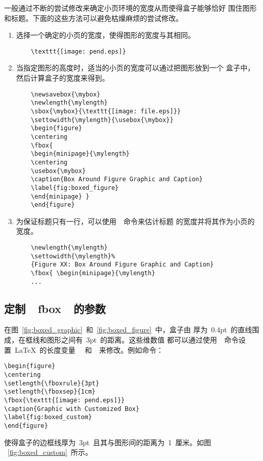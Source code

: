 一般通过不断的尝试修改来确定小页环境的宽度从而使得盒子能够恰好
围住图形和标题。下面的这些方法可以避免枯燥麻烦的尝试修改。
\begin{enumerate}
	\item 选择一个确定的小页的宽度，使得图形的宽度与其相同。
	\begin{Verbatim}
	\texttt{[image: pend.eps]}
	\end{Verbatim}
	\item 当指定图形的高度时，适当的小页的宽度可以通过把图形放到一个
	盒子中，然后计算盒子的宽度来得到。
	\begin{Verbatim}
	\newsavebox{\mybox} 
	\newlength{\mylength} 
	\sbox{\mybox}{\texttt{[image: file.eps]}} 
	\settowidth{\mylength}{\usebox{\mybox}} 
	\begin{figure}
	\centering 
	\fbox{ 
	\begin{minipage}{\mylength} 
	\centering 
	\usebox{\mybox} 
	\caption{Box Around Figure Graphic and Caption} 
	\label{fig:boxed_figure} 
	\end{minipage} } 
	\end{figure}
	\end{Verbatim}
	\item 为保证标题只有一行，可以使用~~命令来估计标题
	的宽度并将其作为小页的宽度。
	\begin{Verbatim}
	\newlength{\mylength} 
	\settowidth{\mylength}%
	{Figure XX: Box Around Figure Graphic and Caption} 
	\fbox{ \begin{minipage}{\mylength} 
	...
	\end{Verbatim}
\end{enumerate}

\subsection{定制~~fbox~~的参数}

在图~\ref{fig:boxed_graphic}~和~\ref{fig:boxed_figure}~中，盒子由
厚为~0.4pt~的直线围成，在框线和图形之间有~3pt~的距离。这些维数值
都可以通过使用~~命令设置~\LaTeX{}~的长度变量
~~和~~来修改。例如命令：
\begin{Verbatim}[xleftmargin=1cm]
\begin{figure} 
\centering 
\setlength{\fboxrule}{3pt} 
\setlength{\fboxsep}{1cm} 
\fbox{\texttt{[image: pend.eps]}} 
\caption{Graphic with Customized Box} 
\label{fig:boxed_custom} 
\end{figure}
\end{Verbatim}
使得盒子的边框线厚为~3pt~且其与图形间的距离为~1~厘米。如图
~\ref{fig:boxed_custom}~所示。

